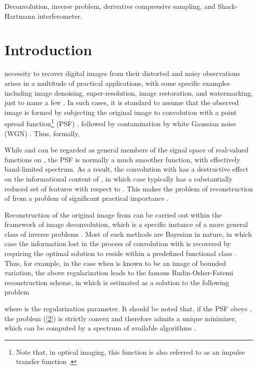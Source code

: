 \pdfoutput=1 \documentclass[journal]{IEEEtran}
\begin{document}
\begin{IEEEkeywords}
Deconvolution, inverse problem, derivative compressive sampling, and Shack-Hartmann interferometer.
\end{IEEEkeywords}

\IEEEpeerreviewmaketitle

\section{Introduction}
 necessity to recover digital images from their distorted and noisy observations arises in a multitude of practical applications, with some specific examples including image denoising, super-resolution, image restoration, and watermarking, just to name a few \cite{30, 28, 29, 40}. In such cases, it is standard to assume that the observed image  is formed by subjecting the original image  to convolution with a point spread function\footnote{Note that, in optical imaging, this function is also referred to as an impulse transfer function \cite{39}.} (PSF) , followed by contamination by white Gaussian noise (WGN) . Thus, formally,

While  and  can be regarded as general members of the signal space  of real-valued functions on , the PSF  is normally a much smoother function, with effectively band-limited spectrum. As a result, the convolution with  has a destructive effect on the informational content of , in which case  typically has a substantially reduced set of features with respect to . This makes the problem of reconstruction of  from  a problem of significant practical importance \cite{41}.

Reconstruction of the original image  from  can be carried out within the framework of image deconvolution, which is a specific instance of a more general class of inverse problems \cite{42}. Most of such methods are Bayesian in nature, in which case the information lost in the process of convolution with  is recovered by requiring the optimal solution to reside within a predefined functional class \cite{26, 27}. Thus, for example, in the case when  is known to be an image of bounded variation, the above regularization leads to the famous Rudin-Osher-Fatemi reconstruction scheme, in which  is estimated as a solution to the following problem \cite{0, 11}

where  is the regularization parameter. It should be noted that, if the PSF obeys , the problem (\ref{2}) is strictly convex and therefore admits a unique minimizer, which can be computed by a spectrum of available algorithms \cite{0, 11}.
\end{document}
